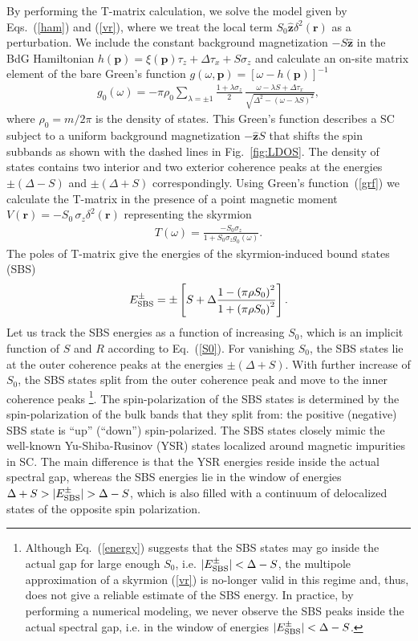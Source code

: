 \documentclass[twocolumn,showpacs,floatfix,longbibliography]{revtex4-1}
\begin{document}
By performing the T-matrix calculation, we solve the model given by Eqs.~(\ref{ham}) and (\ref{vr}), where we treat the local term $S_0 \hat{\bm z} \delta^2(\bm r)$ as a perturbation. We include the constant background magnetization $-S\hat{\bm z}$ in the BdG Hamiltonian $h(\bm p) = \xi(\bm p)\tau_z+\Delta \tau_x +  S\sigma_z$ and calculate an on-site matrix element of the bare Green's function $g(\omega,\bm p) = [\omega-h(\bm p)]^{-1}$
 \begin{align}
	 g_{0}(\omega)  =-\pi\rho_0\sum_{\lambda = \pm 1} \frac{1+\lambda\sigma_z}{2}\,\frac{\omega-\lambda S+\Delta\tau_x}{\sqrt{\Delta^2-\left( \omega-\lambda S \right)^2}},  \label{grf}
\end{align}
where $\rho_0 = m/2\pi$ is the density of states. This Green's function describes a SC subject to a uniform background magnetization $-\hat{\bm z} S$ that shifts the spin subbands as shown with the dashed lines in Fig.~\ref{fig:LDOS}.  The density of states contains two interior and two exterior coherence peaks at the energies $\pm(\Delta-S)$ and $\pm(\Delta+S)$ correspondingly.  Using Green's function~(\ref{grf}) we calculate the T-matrix in the presence of a point magnetic moment $V(\bm r)=-S_0\,\sigma_z \delta^2(\bm r)$ representing the skyrmion
\begin{align}
	T(\omega) =   \frac{-S_0\sigma_z}{1+S_0\sigma_zg_{0}(\omega)}. \label{tm}
\end{align}
The poles of T-matrix give the energies of the skyrmion-induced bound states (SBS)
\begin{align}
	E^\pm_{\rm SBS} = \pm\left[S+\Delta \frac{1-\left( \pi\rho S_0 \right)^2}{1+\left( \pi\rho S_0 \right)^2}\right].
	\label{energy}
\end{align}
Let us track the SBS energies as a function of increasing $S_0$, which is an implicit function of $S$ and $R$ according to Eq.~(\ref{S0}). For vanishing $S_0$, the SBS states lie at the outer coherence peaks at the energies $\pm (\Delta+S)$. With further increase of $S_0$, the SBS states split from the outer coherence peak and move to the inner coherence peaks \footnote{Although Eq.~(\ref{energy}) suggests that the SBS states may go inside the actual gap for large enough  $S_0$, i.e. $|E^\pm_{\rm SBS}|<\Delta-S$, the multipole approximation of a skyrmion (\ref{vr}) is no-longer valid in this regime and, thus, does not give a reliable estimate of the SBS energy. In practice, by performing a numerical modeling, we never observe the SBS peaks inside the actual spectral gap, i.e. in the window of energies $|E^\pm_{\rm SBS}|<\Delta-S$.}. The spin-polarization of the SBS states is determined by the spin-polarization of the bulk bands that they split from: the positive (negative) SBS state is ``up'' (``down'') spin-polarized. The SBS states closely mimic the well-known Yu-Shiba-Rusinov (YSR) states \cite{Yu,Shiba,Rusinov,Balatsky2006} localized around magnetic impurities in SC. The main difference is that the YSR energies reside inside the actual spectral gap, whereas the SBS energies lie in the window of energies $\Delta+S>|E^\pm_{\rm SBS}|>\Delta-S$, which is also filled with a continuum of delocalized states of the opposite spin polarization.
\end{document}
